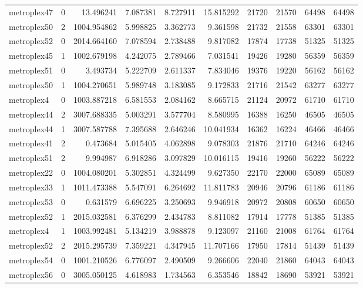 \begin{longtable}{|l|r|r|r|r|r|r|r|r|r|}
metroplex47 & 0 & 13.496241 & 7.087381 & 8.727911 & 15.815292 & 21720 & 21570 & 64498 & 64498 \\
metroplex50 & 2 & 1004.954862 & 5.998825 & 3.362773 & 9.361598 & 21732 & 21558 & 63301 & 63301 \\
metroplex52 & 0 & 2014.664160 & 7.078594 & 2.738488 & 9.817082 & 17874 & 17738 & 51325 & 51325 \\
metroplex45 & 1 & 1002.679198 & 4.242075 & 2.789466 & 7.031541 & 19426 & 19280 & 56359 & 56359 \\
metroplex51 & 0 & 3.493734 & 5.222709 & 2.611337 & 7.834046 & 19376 & 19220 & 56162 & 56162 \\
metroplex50 & 1 & 1004.270651 & 5.989748 & 3.183085 & 9.172833 & 21716 & 21542 & 63277 & 63277 \\
metroplex4 & 0 & 1003.887218 & 6.581553 & 2.084162 & 8.665715 & 21124 & 20972 & 61710 & 61710 \\
metroplex44 & 2 & 3007.688335 & 5.003291 & 3.577704 & 8.580995 & 16388 & 16250 & 46505 & 46505 \\
metroplex44 & 1 & 3007.587788 & 7.395688 & 2.646246 & 10.041934 & 16362 & 16224 & 46466 & 46466 \\
metroplex41 & 2 & 0.473684 & 5.015405 & 4.062898 & 9.078303 & 21876 & 21710 & 64246 & 64246 \\
metroplex51 & 2 & 9.994987 & 6.918286 & 3.097829 & 10.016115 & 19416 & 19260 & 56222 & 56222 \\
metroplex22 & 0 & 1004.080201 & 5.302851 & 4.324499 & 9.627350 & 22170 & 22000 & 65089 & 65089 \\
metroplex33 & 1 & 1011.473388 & 5.547091 & 6.264692 & 11.811783 & 20946 & 20796 & 61186 & 61186 \\
metroplex53 & 0 & 0.631579 & 6.696225 & 3.250693 & 9.946918 & 20972 & 20808 & 60650 & 60650 \\
metroplex52 & 1 & 2015.032581 & 6.376299 & 2.434783 & 8.811082 & 17914 & 17778 & 51385 & 51385 \\
metroplex4 & 1 & 1003.992481 & 5.134219 & 3.988878 & 9.123097 & 21160 & 21008 & 61764 & 61764 \\
metroplex52 & 2 & 2015.295739 & 7.359221 & 4.347945 & 11.707166 & 17950 & 17814 & 51439 & 51439 \\
metroplex54 & 0 & 1001.210526 & 6.776097 & 2.490509 & 9.266606 & 22040 & 21860 & 64043 & 64043 \\
metroplex56 & 0 & 3005.050125 & 4.618983 & 1.734563 & 6.353546 & 18842 & 18690 & 53921 & 53921 \\

\end{longtable}
